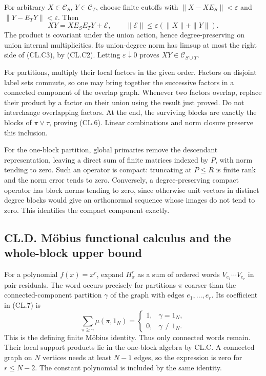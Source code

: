 \documentclass[a4paper,11pt]{article}
\numberwithin{equation}{section}
\begin{document}
For arbitrary \(X\in\mathcal C_S\), \(Y\in\mathcal C_T\), choose finite cutoffs with \(\|X-XE_S\|<\varepsilon\) and \(\|Y-E_TY\|<\varepsilon\). Then \[
XY=XE_SE_TY+\mathcal E,\qquad
\|\mathcal E\|\leq\varepsilon(\|X\|+\|Y\|).
\tag{CL.C3}
\] The product is covariant under the union action, hence degree-preserving on union internal multiplicities. Its union-degree norm has limsup at most the right side of (CL.C3), by (CL.C2). Letting \(\varepsilon\downarrow0\) proves \(XY\in\mathcal C_{S\cup T}\).

For partitions, multiply their local factors in the given order. Factors on disjoint label sets commute, so one may bring together the successive factors in a connected component of the overlap graph. Whenever two factors overlap, replace their product by a factor on their union using the result just proved. Do not interchange overlapping factors. At the end, the surviving blocks are exactly the blocks of \(\pi\vee\tau\), proving (CL.6). Linear combinations and norm closure preserve this inclusion.

For the one-block partition, global primaries remove the descendant representation, leaving a direct sum of finite matrices indexed by \(P\), with norm tending to zero. Such an operator is compact: truncating at \(P\leq R\) is finite rank and the norm error tends to zero. Conversely, a degree-preserving compact operator has block norms tending to zero, since otherwise unit vectors in distinct degree blocks would give an orthonormal sequence whose images do not tend to zero. This identifies the compact component exactly.

\hypertarget{cl.d.-muxf6bius-functional-calculus-and-the-whole-block-upper-bound}{%
\subsection{CL.D. Möbius functional calculus and the whole-block upper bound}\label{cl.d.-muxf6bius-functional-calculus-and-the-whole-block-upper-bound}}

For a polynomial \(f(x)=x^r\), expand \(H_\pi^r\) as a sum of ordered words \(V_{e_1}\cdots V_{e_r}\) in pair residuals. The word occurs precisely for partitions \(\pi\) coarser than the connected-component partition \(\gamma\) of the graph with edges \(e_1,\ldots,e_r\). Its coefficient in (CL.7) is \[
\sum_{\pi\geq\gamma}\mu(\pi,1_N)
=\begin{cases}1,&\gamma=1_N,\\0,&\gamma\ne1_N.\end{cases}
\tag{CL.D1}
\] This is the defining finite Möbius identity. Thus only connected words remain. Their local support products lie in the one-block algebra by CL.C. A connected graph on \(N\) vertices needs at least \(N-1\) edges, so the expression is zero for \(r\leq N-2\). The constant polynomial is included by the same identity.
\end{document}
